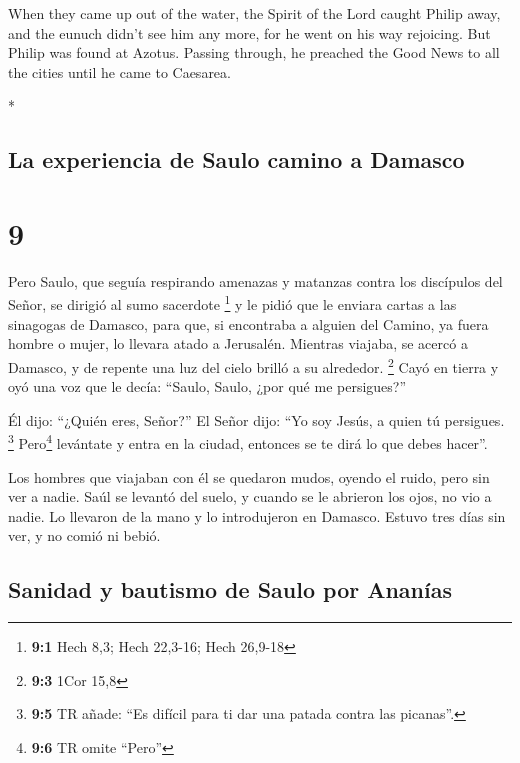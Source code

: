 \begin{paracol}{2}
\begin{otherlanguage}{english}
 When they came up out of the water, the Spirit of the
Lord caught Philip away, and the eunuch didn't see him any more, for he
went on his way rejoicing.  But Philip was found at
Azotus. Passing through, he preached the Good News to all the cities
until he came to Caesarea.

\end{otherlanguage}

\switchcolumn[0]*

\hypertarget{la-experiencia-de-saulo-camino-a-damasco}{%
\subsection{La experiencia de Saulo camino a
Damasco}\label{la-experiencia-de-saulo-camino-a-damasco}}

\hypertarget{section-16}{%
\section{9}\label{section-16}}

 Pero Saulo, que seguía respirando amenazas y matanzas
contra los discípulos del Señor, se dirigió al sumo sacerdote
\footnote{\textbf{9:1} Hech 8,3; Hech 22,3-16; Hech 26,9-18}
 y le pidió que le enviara cartas a las sinagogas de
Damasco, para que, si encontraba a alguien del Camino, ya fuera hombre o
mujer, lo llevara atado a Jerusalén.  Mientras viajaba, se
acercó a Damasco, y de repente una luz del cielo brilló a su alrededor.
\footnote{\textbf{9:3} 1Cor 15,8}  Cayó en tierra y oyó
una voz que le decía: ``Saulo, Saulo, ¿por qué me persigues?''

 Él dijo: ``¿Quién eres, Señor?'' El Señor dijo: ``Yo soy
Jesús, a quien tú persigues. \footnote{\textbf{9:5} TR añade: ``Es
  difícil para ti dar una patada contra las picanas''.} 
Pero\footnote{\textbf{9:6} TR omite ``Pero''} levántate y entra en la
ciudad, entonces se te dirá lo que debes hacer''.

 Los hombres que viajaban con él se quedaron mudos, oyendo
el ruido, pero sin ver a nadie.  Saúl se levantó del
suelo, y cuando se le abrieron los ojos, no vio a nadie. Lo llevaron de
la mano y lo introdujeron en Damasco.  Estuvo tres días
sin ver, y no comió ni bebió.

\hypertarget{sanidad-y-bautismo-de-saulo-por-ananuxedas}{%
\subsection{Sanidad y bautismo de Saulo por
Ananías}\label{sanidad-y-bautismo-de-saulo-por-ananuxedas}}


\end{paracol}

